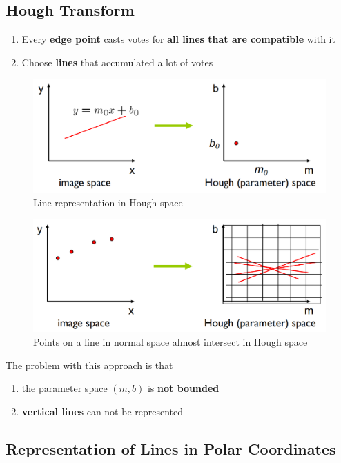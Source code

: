 \documentclass[x11names,11pt,a4paper]{article}
\theoremstyle{definition}
\begin{document}
\subsection{Hough Transform}
\begin{enumerate}
	\item Every \textbf{edge point} casts votes for \textbf{all lines that are compatible} with it
	\item Choose \textbf{lines} that accumulated a lot of votes
\end{enumerate}

\begin{figure}[H]
	\centering
	\includegraphics[width=0.8\linewidth,keepaspectratio]{img/line_representation_hough}
	\caption{Line representation in Hough space}
\end{figure}

\begin{figure}[H]
	\centering
	\includegraphics[width=0.8\linewidth]{img/points_representation_hough}
	\caption{Points on a line in normal space almost intersect in Hough space}
	\label{fig:pointsrepresentationhough}
\end{figure}

\noindent
The problem with this approach is that
\begin{enumerate}[label=\alph*.]
	\item the parameter space $(m,b)$ is \textbf{not bounded}
	\item \textbf{vertical lines} can not be represented
\end{enumerate}

\subsection{Representation of Lines in Polar Coordinates}
\end{document}

